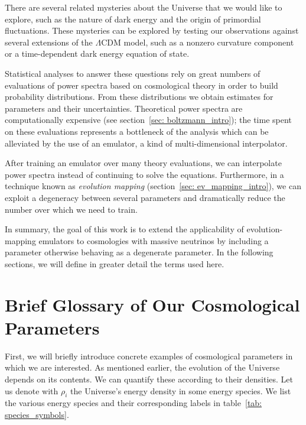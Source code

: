 There are several related mysteries about the Universe that we would like to
explore, such as the nature of dark energy and the origin of primordial
fluctuations. These mysteries can be explored by testing our observations
against several extensions of the $\Lambda$CDM model, such as a nonzero 
curvature component or a time-dependent dark energy equation of state. 

Statistical analyses to answer these questions rely on great numbers of
evaluations of power spectra based on cosmological theory in order to build 
probability 
distributions. From these distributions we obtain estimates for parameters and 
their
uncertainties. Theoretical power spectra are computationally expensive 
(see section~\ref{sec: boltzmann_intro}); the time spent on these evaluations
represents a bottleneck of the analysis which can be alleviated by the
use of an emulator, a kind of multi-dimensional interpolator.

After training an emulator over many theory evaluations, we can interpolate
power spectra instead of continuing to solve the equations. Furthermore, in
a technique known as \textit{evolution mapping}
(section~\ref{sec: ev_mapping_intro}), we can exploit a degeneracy between 
several parameters and dramatically reduce the number over which
we need to train. 

In summary, the goal of this work is to extend the applicability of
evolution-mapping emulators to cosmologies with massive neutrinos by
including a parameter otherwise behaving as a degenerate parameter. In the
following sections, we will define in greater detail the terms used here.

\section{Brief Glossary of Our Cosmological Parameters}
\label{sec: param_glossary}


First, we will briefly introduce concrete
examples of cosmological parameters in which we are interested. As mentioned earlier, the evolution of the Universe depends on its contents.
We can quantify these according to their densities. Let us denote with
$\rho_i$ the Universe's energy density in some energy species. We list the 
various energy species and their corresponding labels in
table~\ref{tab: species_symbols}.


